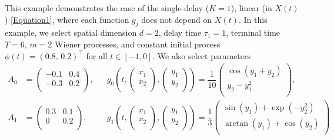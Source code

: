 \documentclass[onefignum]{siamart250211}
\begin{document}
\begin{example}\label{Example1}
This example demonstrates the case of the single-delay ($K=1$), linear (in $X(t)$) \cref{Equation1}, where each function $g_j$ does not depend on $X(t)$. In this example, we select spatial dimension $d=2$, delay time $\tau_1=1$, terminal time $T=6$, $m=2$ Wiener processes, and constant initial process $\phi(t)=(0.8,\,0.2)^\intercal$ for all $t\in[-1,0]$. We also select parameters
\begin{align}
A_0&=\begin{pmatrix}
         -0.1 & 0.4 \\
         -0.3 & 0.2 \\
       \end{pmatrix},&&g_0\left(t,\begin{pmatrix} x_1 \\ x_2 \\ \end{pmatrix},\begin{pmatrix}
           y_1 \\
           y_2 \\
         \end{pmatrix}
       \right)=\dfrac{1}{10}\begin{pmatrix}
                        \cos(y_1+y_2) \\
                        y_2-y_1^2 \\
                      \end{pmatrix},\label{Example1Parameters}\\
A_1&=\begin{pmatrix}
           0.3 & 0.1 \\
           0 & 0.2 \\
         \end{pmatrix},&&g_1\left(t,\begin{pmatrix} x_1 \\ x_2 \\ \end{pmatrix},\begin{pmatrix}
           y_1 \\
           y_2 \\
         \end{pmatrix}
       \right)=\dfrac{1}{3}\begin{pmatrix}
                        \sin(y_1)+\exp\left(-y_2^2\right) \\
                        \arctan(y_1)+\cos(y_2) \\

\end{pmatrix}
\end{align}
\end{example}
\end{document}
